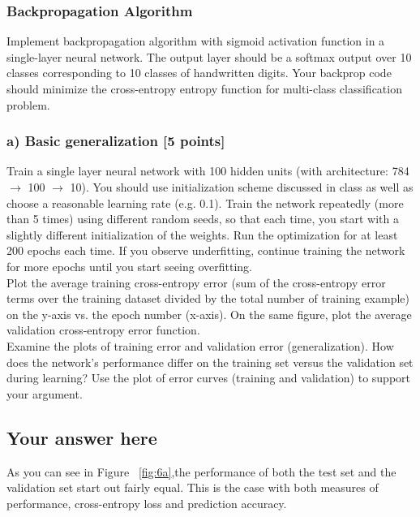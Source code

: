 \documentclass{article}
\begin{document}
\subsubsection*{Backpropagation Algorithm}
Implement backpropagation algorithm with sigmoid activation function 
in a single-layer neural network. The output layer should be 
a softmax output over 10 classes
corresponding to 10 classes of handwritten digits. 
Your backprop code should minimize the cross-entropy entropy function 
for multi-class classification problem.
 

\subsubsection*{a) Basic generalization [5 points]}
Train a single layer neural network with 100 hidden units
(with architecture: 784 $\rightarrow$ 100 $\rightarrow$  10).  
You should
use initialization scheme discussed in class as well as choose a reasonable 
learning rate (e.g. 0.1). Train the network 
repeatedly (more than 5 times) using different random seeds, 
so that each time, you start with a slightly different initialization of 
the weights. 
Run the optimization for at least 200 epochs each time.
If you observe underfitting, continue training the network
for more epochs until you start seeing overfitting.
\\
  
Plot the average training cross-entropy error (sum of 
the cross-entropy error terms over the training dataset  divided by the total number 
of training example) on the y-axis vs. the epoch number (x-axis). 
On the same figure, plot the average validation cross-entropy error function.
\\
 
Examine the plots of training error and validation error (generalization).
How does the network's performance differ on the training set versus the validation set
during learning? Use the plot of error curves (training and validation) to support your argument.



\subsection*{Your answer here}

As you can see in Figure ~\ref{fig:6a},the performance of both the test set and the validation set start out fairly equal. This is the case with both measures of performance, cross-entropy loss and prediction accuracy. 
\end{document}
